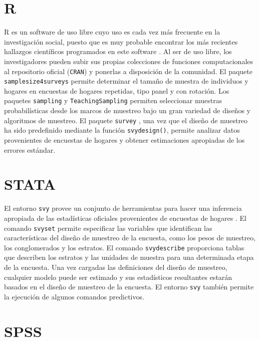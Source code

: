 \documentclass[
  12pt,
  spanish,
]{book}
\begin{document}
\hypertarget{r}{%
\section{R}\label{r}}

R es un software de uso libre cuyo uso es cada vez más frecuente en la investigación social, puesto que es muy probable encontrar los más recientes hallazgos científicos programados en este software \citep{R_2019}. Al ser de uso libre, los investigadores pueden subir sus propias colecciones de funciones computacionales al repositorio oficial (\texttt{CRAN}) y ponerlas a disposición de la comunidad. El paquete \texttt{samplesize4surveys} \citep{ss4s} permite determinar el tamaño de muestra de individuos y hogares en encuestas de hogares repetidas, tipo panel y con rotación. Los paquetes \texttt{sampling} \citep{Yves} y \texttt{TeachingSampling} \citep{TS} permiten seleccionar muestras probabilísticas desde los marcos de muestreo bajo un gran variedad de diseños y algoritmos de muestreo. El paquete \texttt{survey} \citep{TL}, una vez que el diseño de muestreo ha sido predefinido mediante la función \texttt{svydesign()}, permite analizar datos provenientes de encuestas de hogares y obtener estimaciones apropiadas de los errores estándar.

\hypertarget{stata}{%
\section{STATA}\label{stata}}

El entorno \texttt{svy} provee un conjunto de herramientas para hacer una inferencia apropiada de las estadísticas oficiales provenientes de encuestas de hogares \citep{STATA_2017}. El comando \texttt{svyset} permite especificar las variables que identifican las características del diseño de muestreo de la encuesta, como los pesos de muestreo, los conglomerados y los estratos. El comando \texttt{svydescribe} proporciona tablas que describen los estratos y las unidades de muestra para una determinada etapa de la encuesta. Una vez cargadas las definiciones del diseño de muestreo, cualquier modelo puede ser estimado y sus estadísticos resultantes estarán basados en el diseño de muestreo de la encuesta. El entorno \texttt{svy} también permite la ejecución de algunos comandos predictivos.

\hypertarget{spss}{%
\section{SPSS}\label{spss}}
\end{document}
